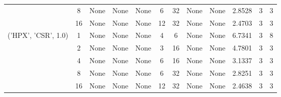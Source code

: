\begin{tabular}{cccccccccccc}
& 8& None& None& None& 6& 32& None& None& 2.8528& 3& 3\\
& 16& None& None& None& 12& 32& None& None& 2.4703& 3& 3\\
\hline
\multirow{5}{*}{('HPX', 'CSR', 1.0)}& 1& None& None& None& 4& 6& None& None& 6.7341& 3& 8\\
& 2& None& None& None& 3& 16& None& None& 4.7801& 3& 3\\
& 4& None& None& None& 6& 16& None& None& 3.1337& 3& 3\\
& 8& None& None& None& 6& 32& None& None& 2.8251& 3& 3\\
& 16& None& None& None& 12& 32& None& None& 2.4638& 3& 3\\
\hline
\end{tabular}



